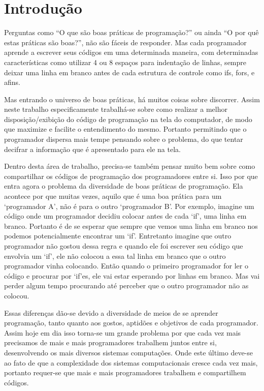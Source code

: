 



\section{Introdução}

    Perguntas como ``O que são boas práticas de programação?'' ou ainda ``O por quê estas práticas
    são boas?'', não são fáceis de responder. Mas cada programador aprende a escrever seus códigos
    em uma determinada maneira, com determinadas características como utilizar 4 ou 8 espaços para
    indentação de linhas, sempre deixar uma linha em branco antes de cada estrutura de controle como
    if\textquotesingle s, for\textquotesingle s, e afins.

    Mas entrando o universo de boas práticas, há muitos coisas sobre discorrer. Assim neste trabalho
    especificamente trabalhá-se sobre como realizar a melhor disposição/exibição do código de
    programação na tela do computador, de modo que maximize e facilite o entendimento do mesmo.
    Portanto permitindo que o programador dispersa mais tempe pensando sobre o problema, do que
    tentar decifrar a informação que é apresentado para ele na tela.

    Dentro desta área de trabalho, precisa-se também pensar muito bem sobre como compartilhar os
    códigos de programação dos programadores entre si. Isso por que entra agora o problema da
    diversidade de boas práticas de programação. Ela acontece por que muitas vezes, aquilo que é uma
    boa prática para um `programador A', não é para o outro `programador B'. Por exemplo, imagine um
    código onde um programador decidiu colocar antes de cada `if', uma linha em branco. Portanto é
    de se esperar que sempre que vemos uma linha em branco nos podemos potencialmente encontrar um
    `if'. Entretanto imagine que outro programador não gostou dessa regra e quando ele foi escrever
    seu código que envolvia um `if', ele não colocou a essa tal linha em branco que o outro
    programador vinha colocando. Então quando o primeiro programador for ler o código e procurar por
    `if'es, ele vai estar esperando por linhas em branco. Mas vai perder algum tempo procurando até
    perceber que o outro programador não as colocou.

    Essas diferenças dão-se devido a diversidade de meios de se aprender programação, tanto quanto
    aos gostos, aptidões e objetivos de cada programador. Assim hoje em dia isso torna-se um grande
    problema por que cada vez mais precisamos de mais e mais programadores trabalhem juntos entre
    si, desenvolvendo os mais diversos sistemas computações. Onde este último deve-se ao fato de que
    a complexidade dos sistemas computacionais cresce cada vez mais, portanto requer-se que mais e
    mais programadores trabalhem e compartilhem códigos.

